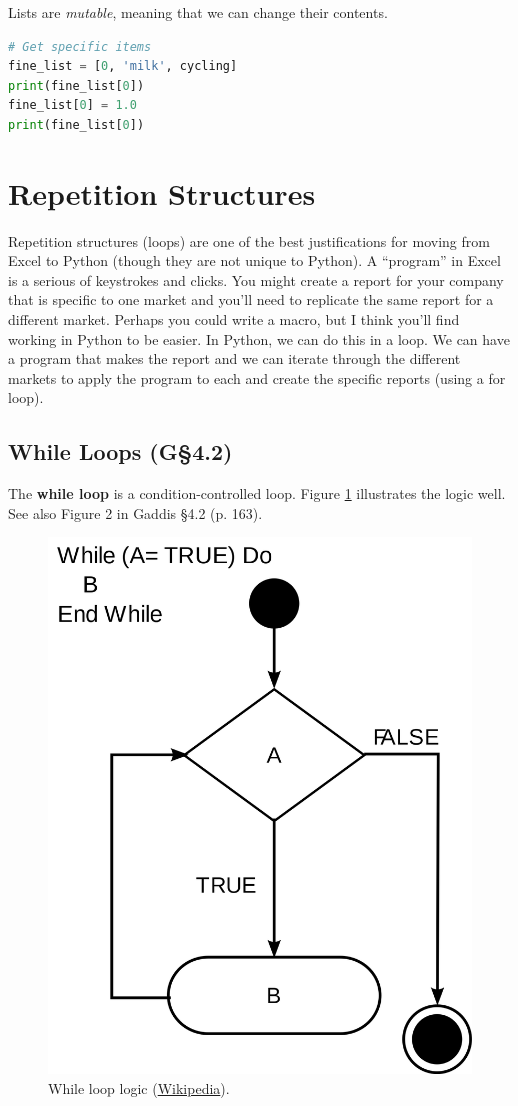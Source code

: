 \bigskip

Lists are \emph{mutable}, meaning that we can change their contents.


\begin{lstlisting}[language = Python]
# Get specific items
fine_list = [0, 'milk', cycling]
print(fine_list[0])
fine_list[0] = 1.0
print(fine_list[0]) \end{lstlisting}


\section{Repetition Structures}

Repetition structures (loops) are one of the best justifications for moving from Excel to Python (though they are not unique to Python). A ``program''
in Excel is a serious of keystrokes and clicks. You might create a report for your company that is specific to one
market and you'll need to replicate the same report for a different market. Perhaps you could write a macro, but
I think you'll find working in Python to be easier. In Python, we can do this in a loop. We can have a program that makes the report and we
can iterate through the different markets to apply the program to each and create the specific reports (using a for loop).

\subsection{While Loops (G\S4.2)}
 
The \textbf{while loop} is a condition-controlled loop. Figure \ref{fig:while} illustrates the logic well. See also Figure 2 in Gaddis \S 4.2 (p. 163).

\begin{figure}[h!] 
\begin{center} 
\includegraphics[width = .55\textwidth]{while_loop.png}
\caption{While loop logic (\textcolor{blue}{\href{https://en.wikipedia.org/wiki/While\_loop}{Wikipedia}}).}
\label{fig:while}
\end{center}
\end{figure}


